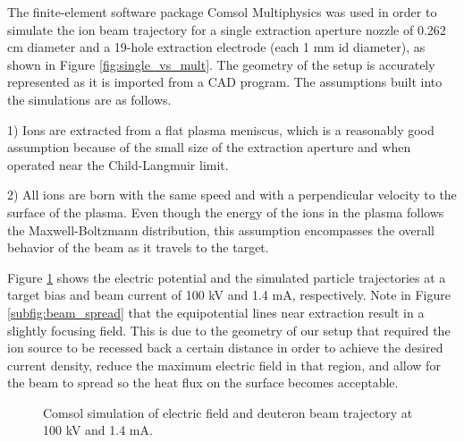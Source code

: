 \documentclass[review]{elsarticle}
\begin{document}
The finite-element software package Comsol Multiphysics was used in order to simulate the ion beam trajectory for a single extraction aperture nozzle of 0.262 cm diameter and a 19-hole extraction electrode (each 1 mm id diameter), as shown in Figure \ref{fig:single_vs_mult}. The geometry of the setup is accurately represented as it is imported from a CAD program. The assumptions built into the simulations are as follows.

1) Ions are extracted from a flat plasma meniscus, which is a reasonably good assumption because of the small size of the extraction aperture and when operated near the Child-Langmuir limit.

2) All ions are born with the same speed and with a perpendicular velocity to the surface of the plasma. Even though the energy of the ions in the plasma follows the Maxwell-Boltzmann distribution, this assumption encompasses the overall behavior of the beam as it travels to the target. 

Figure \ref{fig:beam_spread} shows the electric potential and the simulated particle trajectories at a target bias and beam current of 100 kV and 1.4 mA, respectively. Note in Figure \ref{subfig:beam_spread} that the equipotential lines near extraction result in a slightly focusing field. This is due to the geometry of our setup that required the ion source to be recessed back a certain distance in order to achieve the desired current density, reduce the maximum electric field in that region, and allow for the beam to spread so the heat flux on the surface becomes acceptable.

\begin{figure}
	\centering
	\hfill
	\caption{Comsol simulation of electric field and deuteron beam trajectory at 100 kV and 1.4 mA.}
	\label{fig:beam_spread}
\end{figure}
\end{document}
